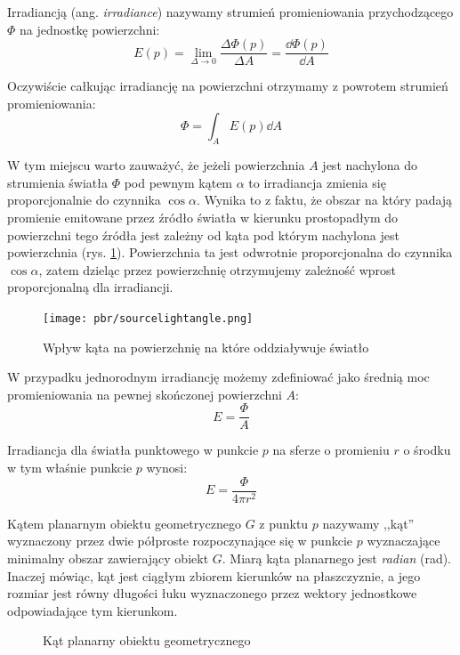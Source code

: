 \documentclass[../main.tex]{subfiles}
\begin{document}
Irradiancją (ang. \textit{irradiance}) nazywamy strumień promieniowania przychodzącego $\Phi$ na jednostkę powierzchni:
\[
E(p) =
    \lim_{\Delta \rightarrow 0} {
        \frac{\Delta \Phi(p)}{\Delta A}
    } =
    \frac{\dd \Phi(p)}{\dd A}
\]

Oczywiście całkując irradiancję na powierzchni otrzymamy z powrotem strumień promieniowania:
\[
\Phi = \int_{A} {
    E(p)
    \dd A
}
\]

W tym miejscu warto zauważyć, że jeżeli powierzchnia $A$ jest nachylona do
strumienia światła $\Phi$ pod pewnym kątem $\alpha$ to irradiancja zmienia się
proporcjonalnie do czynnika $\cos \alpha$. Wynika to z faktu, że obszar na
który padają promienie emitowane przez źródło światła w kierunku prostopadłym
do powierzchni tego źródła jest zależny od kąta pod którym nachylona jest
powierzchnia (rys. \ref{fig:SourceLightAngle}). Powierzchnia ta jest odwrotnie
proporcjonalna do czynnika $\cos \alpha$, zatem dzieląc przez powierzchnię
otrzymujemy zależność wprost proporcjonalną dla irradiancji.

\begin{figure}[ht]
  \centering
  \texttt{[image: pbr/sourcelightangle.png]}
  \caption{Wpływ kąta na powierzchnię na które oddziaływuje światło}
  \label{fig:SourceLightAngle}
\end{figure}

W przypadku jednorodnym irradiancję możemy zdefiniować jako średnią moc
promieniowania na pewnej skończonej powierzchni $A$:
\[
    E = \frac{\Phi}{A}
\]

\begin{example}
  Irradiancja dla światła punktowego w punkcie $p$ na sferze o
  promieniu $r$ o środku w tym właśnie punkcie $p$ wynosi:
  \[
    E = \frac{\Phi}{4 \pi r^2}
  \]
\end{example}

Kątem planarnym obiektu geometrycznego $G$ z punktu $p$ nazywamy ,,kąt'' wyznaczony przez dwie półproste rozpoczynające się w punkcie $p$ wyznaczające minimalny obszar zawierający obiekt $G$. Miarą kąta planarnego jest \textit{radian} (\si{\radian}). Inaczej mówiąc, kąt jest ciągłym zbiorem kierunków na płaszczyznie, a jego rozmiar jest równy długości łuku wyznaczonego przez wektory jednostkowe odpowiadające tym kierunkom.

\begin{figure}[ht]
  \centering
  \caption{Kąt planarny obiektu geometrycznego}
  \label{fig:PlanarAngle}
\end{figure}
\end{document}
